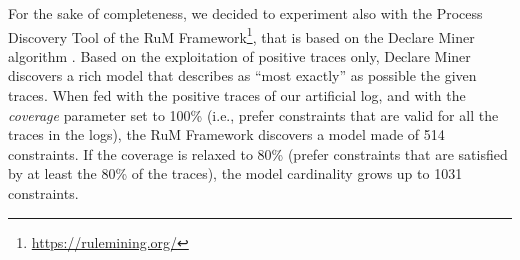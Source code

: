 %
%


For the sake of completeness, we decided to experiment also with the Process Discovery Tool of the RuM Framework\footnote{\url{https://rulemining.org/}}, that is based on the Declare Miner algorithm \cite{2018a-Maggi}. Based on the exploitation of positive traces only, Declare Miner discovers a rich model that describes as ``most exactly'' as possible the given traces. When fed with the positive traces of our artificial log, and with the \emph{coverage} parameter set to 100\% (i.e., prefer constraints that are valid for all the traces in the logs), the RuM Framework discovers a model made of 514 constraints. If the coverage is relaxed to 80\% (prefer constraints that are satisfied by at least the 80\% of the traces), the model cardinality grows up to 1031 constraints.

